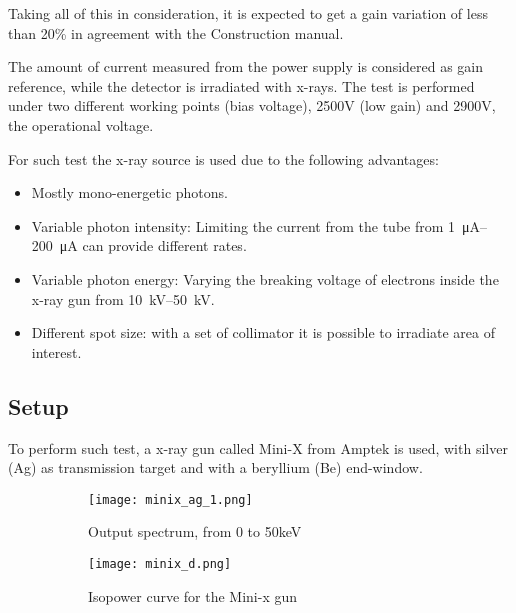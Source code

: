 Taking all of this in consideration, it is expected to get a gain variation of less than 20\% in agreement with the
Construction manual\cite{mann}.\par

The amount of current measured from the power supply is considered as gain reference, while the detector is
irradiated with x-rays. The test is performed under two different working points (bias voltage), 2500V (low gain) and
2900V, the operational voltage.\par

For such test the x-ray source is used due to the following advantages:\par
\begin{itemize}[noitemsep, topsep=0pt, parsep=0pt, partopsep=2pt]
	\item Mostly mono-energetic photons.
	\item Variable photon intensity: Limiting the current from the tube from \SIrange{1}{200}{\micro A} can provide different rates.
	\item Variable photon energy: Varying the breaking voltage of electrons inside the x-ray gun from
	\SIrange{10}{50}{kV}.
	\item Different spot size: with a set of collimator it is possible to irradiate area of interest.
\end{itemize}


\subsection{Setup}
To perform such test, a x-ray gun called Mini-X\cite{xgun} from Amptek is used, with silver (Ag) as transmission target and with a
beryllium (Be) end-window.\par

\begin{figure}
	\centering
	\hspace*{\fill}
	{\begin{subfigure}[b]{0.4\textwidth}
	\centering
	\texttt{[image: minix\_ag\_1.png]}
	\caption{Output spectrum, from 0 to 50keV}\label{fig:minixgun}
	\end{subfigure}
	}
	\hfill
	{
	\begin{subfigure}[b]{0.4\textwidth}
	\centering
	\texttt{[image: minix\_d.png]}
		\caption{Isopower curve for the Mini-x gun}\label{fig:ispower}
	\end{subfigure}
	}
	\hspace*{\fill}
	\caption{}\label{}
\end{figure}

